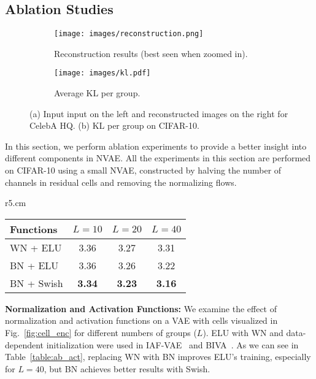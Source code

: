 \documentclass{article}
\begin{document}
\subsection{Ablation Studies}\label{sec:ab_res}
\begin{figure}[t]
\vspace{-0.5cm}
\centering
\begin{subfigure}[b]{.49\textwidth}
\centering
    \setlength{\belowcaptionskip}{1pt}
    \vspace{-0.6cm}
    \texttt{[image: images/reconstruction.png]}
    \caption{Reconstruction results (best seen when zoomed in).}
    \label{fig:recon_hq}
\end{subfigure}
\begin{subfigure}[b]{.49\textwidth}
\centering
    \setlength{\belowcaptionskip}{1pt}
    \vspace{-0.6cm}
    \texttt{[image: images/kl.pdf]}
    \caption{Average KL per group.}
    \label{fig:kl_groups}
\end{subfigure}
\caption{(a) Input input on the left and reconstructed images on the right for CelebA HQ. (b) KL per group on CIFAR-10.}
\label{fig:recon_kl}
\end{figure} 
In this section, we perform ablation experiments to provide a better insight into different components in NVAE. All the experiments in this section are performed on CIFAR-10 using a small NVAE, constructed by halving the number of channels in residual cells and removing the normalizing flows.

\begin{wraptable}{r}{5.cm}
\vspace{-4mm}
\centering
{\footnotesize
\setlength{\tabcolsep}{2pt}
\caption{\small Normalization \& activation}\label{table:ab_act}
    \begin{tabular}{lccc}
    \toprule
    Functions    & $L=10$ & $L=20$ & $L=40$ \\
    \midrule
    WN + ELU     & 3.36  & 3.27  & 3.31  \\
    BN + ELU     & 3.36  & 3.26  & 3.22  \\
    BN + Swish   & \bf 3.34  & \bf 3.23  & \bf 3.16  \\
    \bottomrule
    \end{tabular}}
\vspace{-4mm}
\end{wraptable}
\textbf{Normalization and Activation Functions:} We examine the effect of normalization and activation functions on a VAE with cells visualized in Fig.~\ref{fig:cell_enc} for different numbers of groups ($L$). ELU with WN and data-dependent initialization were used in IAF-VAE~\cite{kingma2016improved} and BIVA~\cite{maaloe2019biva}. As we can see in Table~\ref{table:ab_act}, replacing WN with BN improves ELU's training, especially for $L=40$, but BN achieves better results with Swish. 
\end{document}
